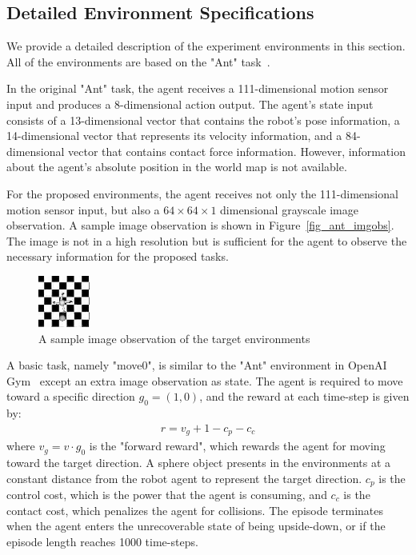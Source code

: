 
\subsection{Detailed Environment Specifications}
We provide a detailed description of the experiment environments in this section. All of the environments are based on the "Ant" task~\cite{openaigym}. 

In the original "Ant" task, the agent receives a 111-dimensional motion sensor input and produces a 8-dimensional action output. The agent's state input consists of a 13-dimensional vector that contains the robot's pose information, a 14-dimensional vector that represents its velocity information, and a 84-dimensional vector that contains contact force information. However, information about the agent's absolute position in the world map is not available.

For the proposed environments, the agent receives not only the 111-dimensional motion sensor input, but also a $64\times 64\times 1$ dimensional grayscale image observation. A sample image observation is shown in Figure~\ref{fig_ant_imgobs}. The image is not in a high resolution but is sufficient for the agent to observe the necessary information for the proposed tasks.

\begin{figure}[H]
	\includegraphics{images/ant_imgobs.png}
	\centering
	\caption{A sample image observation of the target environments}
\end{figure}\label{fig_ant_imgobs}

A basic task, namely "move0", is similar to the "Ant" environment in OpenAI Gym~\cite{openaigym} except an extra image observation as state. The agent is required to move toward a specific direction $g_0=(1,0)$, and the reward at each time-step is given by:
\begin{align}
r = v_g + 1-c_p-c_c
\end{align}
where $v_g=v \cdot g_0$ is the "forward reward", which rewards the agent for moving toward the target direction. A sphere object presents in the environments at a constant distance from the robot agent to represent the target direction.  $c_p$ is the control cost, which is the power that the agent is consuming, and $c_c$ is the contact cost, which penalizes the agent for collisions. The episode terminates when the agent enters the unrecoverable state of being upside-down, or if the episode length reaches 1000 time-steps.

